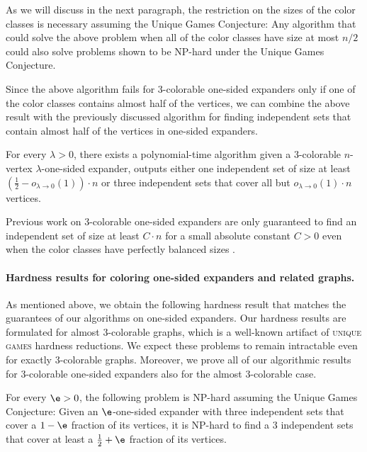 As we will discuss in the next paragraph, the restriction on the sizes of the color classes is necessary assuming the Unique Games Conjecture:
Any algorithm that could solve the above problem when all of the color classes have size at most \(n/2\) could also solve problems shown to be NP-hard under the Unique Games Conjecture.

Since the above algorithm fails for \(3\)-colorable one-sided expanders only if one of the color classes contains almost half of the vertices, we can combine the above result with the previously discussed algorithm for finding independent sets that contain almost half of the vertices in one-sided expanders.

\begin{corollary}
  For every \(\lambda>0\), there exists a polynomial-time algorithm given a \(3\)-colorable \(n\)-vertex \(\lambda\)-one-sided expander, outputs either one independent set of size at least \((\tfrac 1 2-o_{\lambda\to 0}(1))\cdot n\) or three independent sets that cover all but \(o_{\lambda\to 0}(1)\cdot n\) vertices.
\end{corollary}

Previous work on 3-colorable one-sided expanders are only guaranteed to find an independent set of size at least \(C\cdot n\) for a small absolute constant \(C>0\) even when the color classes have perfectly balanced sizes \cite{bafna-hsieh-kothari}.


\paragraph{Hardness results for coloring one-sided expanders and related graphs.}

As mentioned above, we obtain the following hardness result that matches the guarantees of our algorithms on one-sided expanders.
Our hardness results are formulated for almost 3-colorable graphs, which is a well-known artifact of \textsc{unique games} hardness reductions.
We expect these problems to remain intractable even for exactly 3-colorable graphs.
Moreover, we prove all of our algorithmic results for 3-colorable one-sided expanders also for the almost 3-colorable case.

\begin{theorem}
  For every \(\e>0\), the following problem is NP-hard assuming the Unique Games Conjecture:
  Given an \(\e\)-one-sided expander with three independent sets that cover a \(1-\e\) fraction of its vertices,
  it is NP-hard to find a 3 independent sets that cover at least a \(\tfrac 12 +\e\) fraction of its vertices.
\end{theorem}

